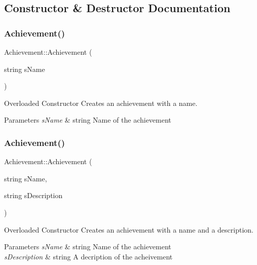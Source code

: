 \subsection{Constructor \& Destructor Documentation}
\hypertarget{class_achievement_ad36246aeeae27b2e82a3a6d259cd483d}{}\label{class_achievement_ad36246aeeae27b2e82a3a6d259cd483d} 
\subsubsection{\texorpdfstring{Achievement()}{Achievement()}\hspace{0.1cm}{\footnotesize\ttfamily [1/3]}}
{\footnotesize\ttfamily Achievement\+::\+Achievement (\begin{DoxyParamCaption}\item[{string}]{s\+Name }\end{DoxyParamCaption})}



Overloaded Constructor Creates an achievement with a name. 


\begin{DoxyParams}{Parameters}
{\em s\+Name} & string Name of the achievement \\
\hline
\end{DoxyParams}
\hypertarget{class_achievement_ac3d729e601b49f195f671e93422159f5}{}\label{class_achievement_ac3d729e601b49f195f671e93422159f5} 
\subsubsection{\texorpdfstring{Achievement()}{Achievement()}\hspace{0.1cm}{\footnotesize\ttfamily [2/3]}}
{\footnotesize\ttfamily Achievement\+::\+Achievement (\begin{DoxyParamCaption}\item[{string}]{s\+Name,  }\item[{string}]{s\+Description }\end{DoxyParamCaption})}



Overloaded Constructor Creates an achievement with a name and a description. 


\begin{DoxyParams}{Parameters}
{\em s\+Name} & string Name of the achievement \\
\hline
{\em s\+Description} & string A decription of the acheivement \\
\hline
\end{DoxyParams}
\hypertarget{class_achievement_a83be456772eb1bb65ba8414111b34040}{}\label{class_achievement_a83be456772eb1bb65ba8414111b34040} 
